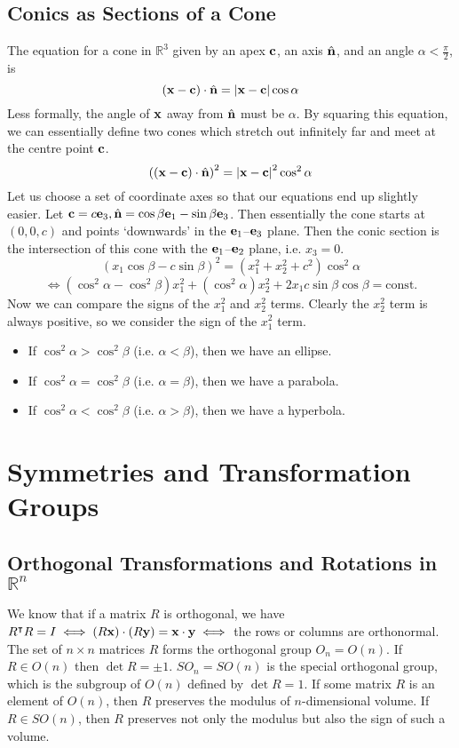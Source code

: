 \documentclass{article}
\begin{document}
\subsection{Conics as Sections of a Cone}
The equation for a cone in $\mathbb R^3$ given by an apex $\vb c$, an axis $\hat{\vb n}$, and an angle $\alpha < \frac{\pi}{2}$, is
\[ (\vb x - \vb c)\cdot\hat{\vb n} = \abs{\vb x - \vb c}\cos \alpha \]
Less formally, the angle of $\vb x$ away from $\hat{\vb n}$ must be $\alpha$. By squaring this equation, we can essentially define two cones which stretch out infinitely far and meet at the centre point $\vb c$.
\[ \left( (\vb x - \vb c)\cdot\hat{\vb n} \right)^2 = \abs{\vb x - \vb c}^2\cos^2 \alpha \]
Let us choose a set of coordinate axes so that our equations end up slightly easier. Let $\vb c = c\vb e_3, \hat{\vb n} = \cos\beta \vb e_1 - \sin\beta \vb e_3$. Then essentially the cone starts at $(0, 0, c)$ and points `downwards' in the $\vb e_1$--$\vb e_3$ plane. Then the conic section is the intersection of this cone with the $\vb e_1$--$\vb e_2$ plane, i.e. $x_3 = 0$.
\[ (x_1\cos\beta - c\sin\beta)^2 = (x_1^2 + x_2^2 + c^2)\cos^2\alpha \]
\[ \iff (\cos^2\alpha - \cos^2\beta)x_1^2 + (\cos^2\alpha)x_2^2 + 2x_1c\sin\beta\cos\beta = \text{const.} \]
Now we can compare the signs of the $x_1^2$ and $x_2^2$ terms. Clearly the $x_2^2$ term is always positive, so we consider the sign of the $x_1^2$ term.
\begin{itemize}
    \item If $\cos^2 \alpha > \cos^2\beta$ (i.e. $\alpha < \beta$), then we have an ellipse.
    \item If $\cos^2 \alpha = \cos^2\beta$ (i.e. $\alpha = \beta$), then we have a parabola.
    \item If $\cos^2 \alpha < \cos^2\beta$ (i.e. $\alpha > \beta$), then we have a hyperbola.
\end{itemize}

\section{Symmetries and Transformation Groups}
\subsection{Orthogonal Transformations and Rotations in $\mathbb R^n$}
We know that if a matrix $R$ is orthogonal, we have $R^\intercal R = I \iff (R\vb x) \cdot (R\vb y) = \vb x \cdot \vb y \iff$ the rows or columns are orthonormal. The set of $n \times n$ matrices $R$ forms the orthogonal group $O_n = O(n)$. If $R \in O(n)$ then $\det R = \pm 1$. $SO_n = SO(n)$ is the special orthogonal group, which is the subgroup of $O(n)$ defined by $\det R = 1$. If some matrix $R$ is an element of $O(n)$, then $R$ preserves the modulus of $n$-dimensional volume. If $R \in SO(n)$, then $R$ preserves not only the modulus but also the sign of such a volume.
\end{document}
